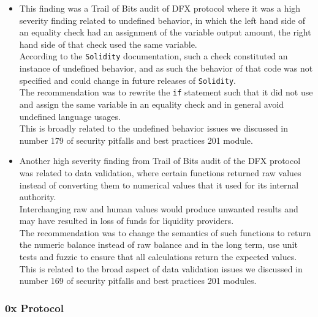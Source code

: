 \begin{itemize}
\item
  This finding was a Trail of Bits audit of DFX protocol where it was a
  high severity finding related to undefined behavior, in which the left
  hand side of an equality check had an assignment of the variable
  output amount, the right hand side of that check used the same
  variable.\\

  According to the \texttt{Solidity} documentation, such a check
  constituted an instance of undefined behavior, and as such the
  behavior of that code was not specified and could change in future
  releases of \texttt{Solidity}.\\

  The recommendation was to rewrite the \texttt{if} statement such that
  it did not use and assign the same variable in an equality check and
  in general avoid undefined language usages.\\

  This is broadly related to the undefined behavior issues we discussed
  in number 179 of security pitfalls and best practices 201 module.
\item
  Another high severity finding from Trail of Bits audit of the DFX
  protocol was related to data validation, where certain functions
  returned raw values instead of converting them to numerical values
  that it used for its internal authority.\\

  Interchanging raw and human values would produce unwanted results and
  may have resulted in loss of funds for liquidity providers.\\

  The recommendation was to change the semantics of such functions to
  return the numeric balance instead of raw balance and in the long
  term, use unit tests and fuzzic to ensure that all calculations return
  the expected values. This is related to the broad aspect of data
  validation issues we discussed in number 169 of security pitfalls and
  best practices 201 modules.
\end{itemize}

\subsubsection{0x Protocol}\label{x-protocol}


